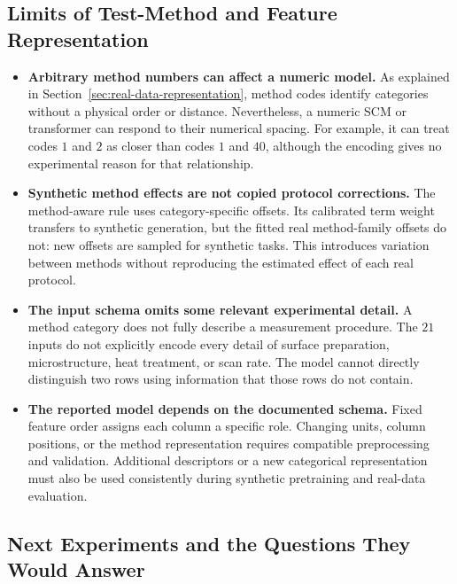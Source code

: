 \documentclass[11pt]{article}
\newenvironment{notes}
  {\begin{itemize}\setlength{\itemsep}{0.45em}\setlength{\parsep}{0pt}}
  {\end{itemize}}
\begin{document}
\subsection{Limits of Test-Method and Feature Representation}
\label{sec:representation-limitations}

\begin{notes}
    \item \textbf{Arbitrary method numbers can affect a numeric model.}
    As explained in Section~\ref{sec:real-data-representation},
    method codes identify categories without a physical
    order or distance. Nevertheless, a numeric SCM or
    transformer can respond to their numerical spacing.
    For example, it can treat codes \(1\) and \(2\) as closer
    than codes \(1\) and \(40\), although the encoding gives
    no experimental reason for that relationship.

    \item \textbf{Synthetic method effects are not copied protocol corrections.}
    The method-aware rule uses category-specific offsets.
    Its calibrated term weight transfers to synthetic
    generation, but the fitted real method-family offsets
    do not: new offsets are sampled for synthetic tasks.
    This introduces variation between methods without
    reproducing the estimated effect of each real protocol.

    \item \textbf{The input schema omits some relevant experimental detail.}
    A method category does not fully describe a measurement
    procedure. The \(21\) inputs do not explicitly encode
    every detail of surface preparation, microstructure,
    heat treatment, or scan rate.
    The model cannot directly distinguish two rows using
    information that those rows do not contain.

    \item \textbf{The reported model depends on the documented schema.}
    Fixed feature order assigns each column a specific role.
    Changing units, column positions, or the method
    representation requires compatible preprocessing and
    validation. Additional descriptors or a new categorical
    representation must also be used consistently during
    synthetic pretraining and real-data evaluation.
\end{notes}

\subsection{Next Experiments and the Questions They Would Answer}
\label{sec:next-experiments}
\end{document}
